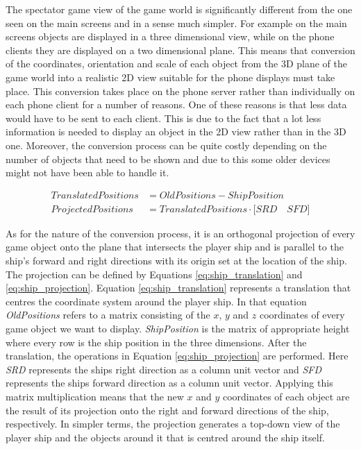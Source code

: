 \documentclass[a4paper,11pt]{article}
\begin{document}
The spectator game view of the game world is significantly different from the one seen on the main screens and in a sense much simpler. For example on the main screens objects are displayed in a three dimensional view, while on the phone clients they are displayed on a two dimensional plane. This means that conversion of the coordinates, orientation and scale of each object from the 3D plane of the game world into a realistic 2D view suitable for the phone displays must take place. This conversion takes place on the phone server rather than individually on each phone client for a number of reasons. One of these reasons is that less data would have to be sent to each client. This is due to the fact that a lot less information is needed to display an object in the 2D view rather than in the 3D one. Moreover, the conversion process can be quite costly depending on the number of objects that need to be shown and due to this some older devices might not have been able to handle it.

\begin{align}
	Translated Positions &= Old Positions - Ship Position \label{eq:ship_translation} \\
    Projected Positions  &= Translated Positions \cdot \Big[ SRD \quad SFD \Big] \label{eq:ship_projection}
\end{align}

As for the nature of the conversion process, it is an orthogonal projection of every game object onto the plane that intersects the player ship and is parallel to the ship's forward and right directions with its origin set at the location of the ship. The projection can be defined by Equations \ref{eq:ship_translation} and \ref{eq:ship_projection}. Equation \ref{eq:ship_translation} represents a translation that centres the coordinate system around the player ship. In that equation \emph{OldPositions} refers to a matrix consisting of the $x$, $y$ and $z$ coordinates of every game object we want to display. \emph{ShipPosition} is the matrix of appropriate height where every row is the ship position in the three dimensions. After the translation, the operations in Equation \ref{eq:ship_projection} are performed. Here \emph{SRD} represents the ships right direction as a column unit vector and \emph{SFD} represents the ships forward direction as a column unit vector. Applying this matrix multiplication means that the new $x$ and $y$ coordinates of each object are the result of its projection onto the right and forward directions of the ship, respectively. In simpler terms, the projection generates a top-down view of the player ship and the objects around it that is centred around the ship itself.
\end{document}
